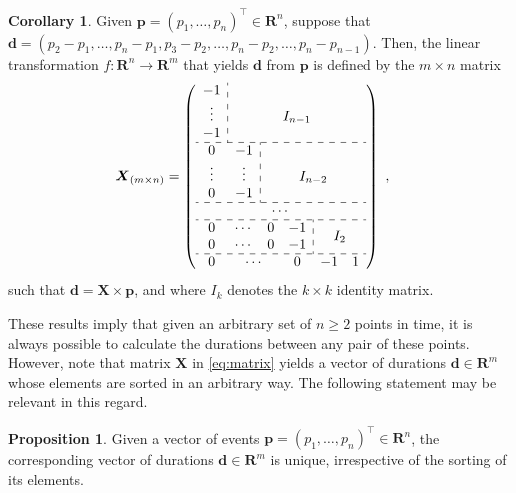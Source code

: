 \documentclass{bmcart}
\theoremstyle{definition}
\newtheorem{proposition}{Proposition}[section]
\newtheorem{corollary}{Corollary}[proposition]
\begin{document}
\begin{corollary}
 Given $\boldsymbol{p}=(p_1,\ldots,p_n)^\top\in\mathbf{R}^n$, suppose that $\boldsymbol{d}=(p_2-p_1,\dots,p_n-p_1,p_3-p_2,\dots,p_n-p_2,\dots,p_n-p_{n-1})$. Then, the linear transformation $f:\mathbf{R}^n\to\mathbf{R}^m$ that yields $\boldsymbol{d}$ from $\boldsymbol{p}$ is defined by the $m\times n$ matrix
 \begin{align}
  \boldsymbol{X}_{(m\times n)}&= \left(\begin{array}{cccccc}
			  \multicolumn{1}{c:}{-1}			& \multicolumn{5}{c}{}					\\
			  \multicolumn{1}{c:}{\vdots}	 		& \multicolumn{5}{c}{I_{n-1}}	 			\\  
			  \multicolumn{1}{c:}{-1}			& \multicolumn{5}{c}{}					\\ \hdashline
			  0		& \multicolumn{1}{c:}{-1}	& \multicolumn{4}{c}{}					\\	 
			  \vdots	& \multicolumn{1}{c:}{\vdots}	& \multicolumn{4}{c}{I_{n-2}}  				\\
			  0		& \multicolumn{1}{c:}{-1}	& \multicolumn{4}{c}{}					\\ \hdashline
			  \multicolumn{6}{c}{\cdots}										\\ \hdashline
			  0		& \cdots	& 0		& \multicolumn{1}{c:}{-1}	& 	& 		\\ 
			  0		& \cdots	& 0		& \multicolumn{1}{c:}{-1}	& \multicolumn{2}{c}{\smash{\raisebox{.5\normalbaselineskip}{$I_2$}}}	\\ \hdashline
			  0		& \multicolumn{2}{c}{\cdots}	& 0				& -1	& 1		\\
			\end{array}\right)
  \label{eq:matrix}\ ,
 \end{align}
 such that $\boldsymbol{d}=\boldsymbol{X}\times\boldsymbol{p}$, and where $I_k$ denotes the $k\times k$ identity matrix.
\end{corollary}

These results imply that given an arbitrary set of $n\geq2$ points in time, it
is always possible to calculate the durations between any pair of these points. However, note that matrix $\boldsymbol{X}$ in \eqref{eq:matrix} yields a vector of durations $\boldsymbol{d}\in\mathbf{R}^m$ whose elements are sorted in an arbitrary way. The following statement may be relevant in this regard.

\begin{proposition}
 Given a vector of events $\boldsymbol{p}=(p_1,\ldots,p_n)^\top\in\mathbf{R}^n$, the corresponding vector of durations $\boldsymbol{d}\in\mathbf{R}^m$ is unique, irrespective of the sorting of its elements.
\end{proposition}
\end{document}
